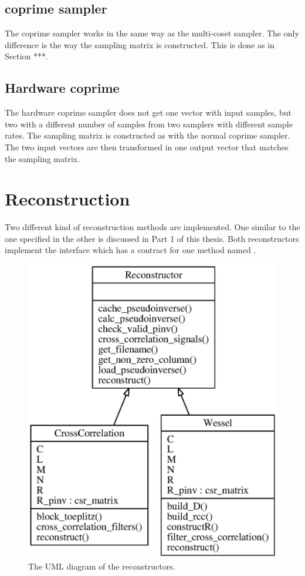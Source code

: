\documentclass[a4paper, openany, oneside]{memoir}
\begin{document}
\subsection{coprime sampler}
\label{sec:coprime-sampler}
The coprime sampler works in the same way as the multi-coset sampler. The only difference is the way the sampling matrix is constructed. This is done as in Section ***.

\subsection{Hardware coprime}
\label{sec:hardware-coprime}
The hardware coprime sampler does not get one vector with input samples, but two with a different number of samples from two samplers with different sample rates. The sampling matrix is constructed as with the normal coprime sampler. The two input vectors are then transformed in one output vector that matches the sampling matrix.

\section{Reconstruction}
\label{sec:reconstruction}
Two different kind of reconstruction methods are implemented. One similar to the one specified in \cite{ariananda2012compressive} the other is discussed in Part 1 of this thesis. Both reconstructors implement the interface  which has a contract for one method named .

\begin{figure}
    \centering
    \includegraphics{./figures/classes_reconstruction.eps}
    \caption{The UML diagram of the reconstructors.}
    \label{fig:umlreconstructor}
\end{figure}
\end{document}
